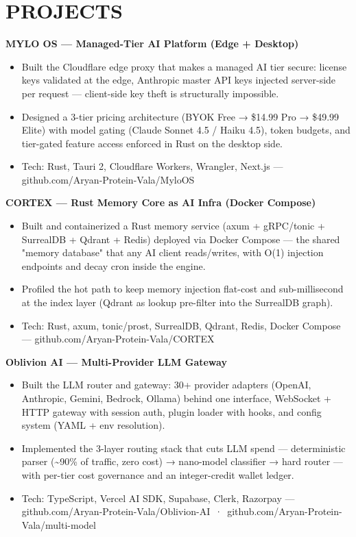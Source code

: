 \documentclass[9pt]{article}
\begin{document}
\section*{PROJECTS}
\textbf{MYLO OS  ---  Managed-Tier AI Platform (Edge + Desktop)}
\vspace{1pt}
\begin{itemize}[leftmargin=11pt,itemsep=0pt,topsep=1pt,parsep=0pt]
\item Built the Cloudflare edge proxy that makes a managed AI tier secure: license keys validated at the edge, Anthropic master API keys injected server-side per request  ---  client-side key theft is structurally impossible.
\item Designed a 3-tier pricing architecture (BYOK Free → \$14.99 Pro → \$49.99 Elite) with model gating (Claude Sonnet 4.5 / Haiku 4.5), token budgets, and tier-gated feature access enforced in Rust on the desktop side.
\item Tech: Rust, Tauri 2, Cloudflare Workers, Wrangler, Next.js  ---  github.com/Aryan-Protein-Vala/MyloOS
\end{itemize}
\textbf{CORTEX  ---  Rust Memory Core as AI Infra (Docker Compose)}
\vspace{1pt}
\begin{itemize}[leftmargin=11pt,itemsep=0pt,topsep=1pt,parsep=0pt]
\item Built and containerized a Rust memory service (axum + gRPC/tonic + SurrealDB + Qdrant + Redis) deployed via Docker Compose  ---  the shared "memory database" that any AI client reads/writes, with O(1) injection endpoints and decay cron inside the engine.
\item Profiled the hot path to keep memory injection flat-cost and sub-millisecond at the index layer (Qdrant as lookup pre-filter into the SurrealDB graph).
\item Tech: Rust, axum, tonic/prost, SurrealDB, Qdrant, Redis, Docker Compose  ---  github.com/Aryan-Protein-Vala/CORTEX
\end{itemize}
\textbf{Oblivion AI  ---  Multi-Provider LLM Gateway}
\vspace{1pt}
\begin{itemize}[leftmargin=11pt,itemsep=0pt,topsep=1pt,parsep=0pt]
\item Built the LLM router and gateway: 30+ provider adapters (OpenAI, Anthropic, Gemini, Bedrock, Ollama) behind one interface, WebSocket + HTTP gateway with session auth, plugin loader with hooks, and config system (YAML + env resolution).
\item Implemented the 3-layer routing stack that cuts LLM spend  ---  deterministic parser (\textasciitilde{}90\% of traffic, zero cost) → nano-model classifier → hard router  ---  with per-tier cost governance and an integer-credit wallet ledger.
\item Tech: TypeScript, Vercel AI SDK, Supabase, Clerk, Razorpay  ---  github.com/Aryan-Protein-Vala/Oblivion-AI \,·\, github.com/Aryan-Protein-Vala/multi-model
\end{itemize}
\end{document}
